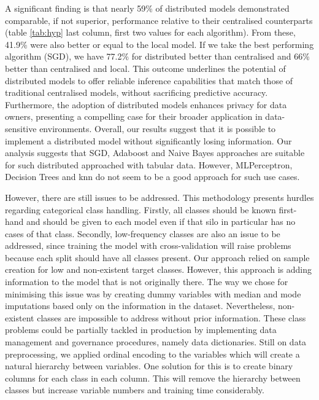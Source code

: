 


A significant finding is that nearly 59\% of distributed models demonstrated comparable, if not superior, performance relative to their centralised counterparts (table \ref{tab:hyp} last column, first two values for each algorithm). From these, 41.9\% were also better or equal to the local model. If we take the best performing algorithm (SGD), we have 77.2\% for distributed better than centralised and 66\% better than centralised and local. This outcome underlines the potential of distributed models to offer reliable inference capabilities that match those of traditional centralised models, without sacrificing predictive accuracy. Furthermore, the adoption of distributed models enhances privacy for data owners, presenting a compelling case for their broader application in data-sensitive environments. Overall, our results suggest that it is possible to implement a distributed model without significantly losing information. Our analysis suggests that SGD, Adaboost and Naive Bayes approaches are suitable for such distributed approached with tabular data. However, MLPerceptron, Decision Trees and \ac{knn} do not seem to be a good approach for such use cases.

However, there are still issues to be addressed. This methodology presents hurdles regarding categorical class handling. Firstly, all classes should be known first-hand and should be given to each model even if that silo in particular has no cases of that class. Secondly, low-frequency classes are also an issue to be addressed, since training the model with cross-validation will raise problems because each split should have all classes present. Our approach relied on sample creation for low and non-existent target classes. However, this approach is adding information to the model that is not originally there. The way we chose for minimising this issue was by creating dummy variables with median and mode imputations based only on the information in the dataset. Nevertheless, non-existent classes are impossible to address without prior information. These class problems could be partially tackled in production by implementing data management and governance procedures, namely data dictionaries. Still on data preprocessing, we applied ordinal encoding to the variables which will create a natural hierarchy between variables. One solution for this is to create binary columns for each class in each column. This will remove the hierarchy between classes but increase variable numbers and training time considerably.\\

